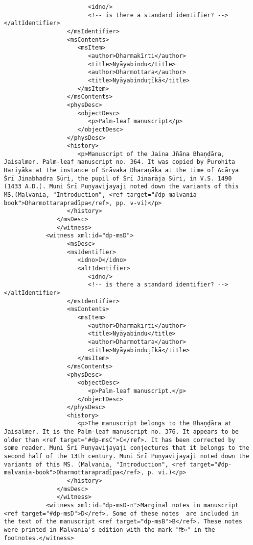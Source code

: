 \documentclass[article,12pt,a4paper]{memoir}
\begin{document}
\begin{verbatim}
                        <idno/>
                        <!-- is there a standard identifier? --></altIdentifier>
                  </msIdentifier>
                  <msContents>
                     <msItem>
                        <author>Dharmakīrti</author>
                        <title>Nyāyabindu</title>
                        <author>Dharmottara</author>
                        <title>Nyāyabinduṭīkā</title>
                     </msItem>
                  </msContents>
                  <physDesc>
                     <objectDesc>
                        <p>Palm-leaf manuscript</p>
                     </objectDesc>
                  </physDesc>
                  <history>
                     <p>Manuscript of the Jaina Jñāna Bhaṇḍāra, Jaisalmer. Palm-leaf manuscript no. 364. It was copied by Purohita Hariyāka at the instance of Śrāvaka Dharaṇāka at the time of Ācārya Śrī Jinabhadra Sūri, the pupil of Śrī Jinarāja Sūri, in V.S. 1490 (1433 A.D.). Muni Śrī Puṇyavijayaji noted down the variants of this MS.(Malvania, "Introduction", <ref target="#dp-malvania-book">Dharmottarapradīpa</ref>, pp. v-vi)</p>
                  </history>
               </msDesc>
	           </witness>
            <witness xml:id="dp-msD">
	              <msDesc>
                  <msIdentifier>
                     <idno>D</idno>
                     <altIdentifier>
                        <idno/>
                        <!-- is there a standard identifier? --></altIdentifier>
                  </msIdentifier>
                  <msContents>
                     <msItem>
                        <author>Dharmakīrti</author>
                        <title>Nyāyabindu</title>
                        <author>Dharmottara</author>
                        <title>Nyāyabinduṭīkā</title>
                     </msItem>
                  </msContents>
                  <physDesc>
                     <objectDesc>
                        <p>Palm-leaf manuscript.</p>
                     </objectDesc>
                  </physDesc>
                  <history>
                     <p>The manuscript belongs to the Bhaṇḍāra at Jaisalmer. It is the Palm-leaf manuscript no. 376. It appears to be older than <ref target="#dp-msC">C</ref>. It has been corrected by some reader. Muni Śrī Puṇyavijayaji conjectures that it belongs to the second half of the 13th century. Muni Śrī Puṇyavijayaji noted down the variants of this MS. (Malvania, "Introduction", <ref target="#dp-malvania-book">Dharmottarapradīpa</ref>, p. vi.)</p>
                  </history>
               </msDesc>
	           </witness>
            <witness xml:id="dp-msD-n">Marginal notes in manuscript <ref target="#dp-msD">D</ref>. Some of these notes  are included in the text of the manuscript <ref target="dp-msB">B</ref>. These notes were printed in Malvania's edition with the mark "टि०" in the footnotes.</witness>

\end{verbatim}
\end{document}
